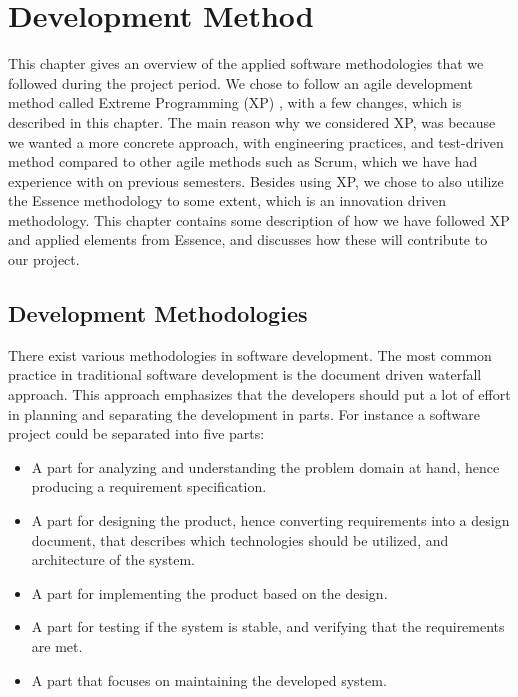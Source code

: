 
\chapter{Development Method}
\label{cha:development_method}

This chapter gives an overview of the applied software methodologies that we followed during the project period. We chose to follow an agile development method called Extreme Programming (XP) \parencite{xp}, with a few changes, which is described in this chapter. The main reason why we considered XP, was because we wanted a more concrete approach, with engineering practices, and test-driven method compared to other agile methods such as Scrum, which we have had experience with on previous semesters. Besides using XP, we chose to also utilize the Essence methodology \parencite{essence_book} to some extent, which is an innovation driven methodology. This chapter contains some description of how we have followed XP and applied elements from Essence, and discusses how these will contribute to our project.

\section{Development Methodologies}
\label{sec:development_methodologies}
There exist various methodologies in software development. The most common practice in traditional software development is the document driven waterfall approach. This approach emphasizes that the developers should put a lot of effort in planning and separating the development in parts. For instance a software project could be separated into five parts:
\\
\begin{itemize}[noitemsep]
    \item A part for analyzing and understanding the problem domain at hand, hence producing a requirement specification. 
    \item A part for designing the product, hence converting requirements into a design document, that describes which technologies should be utilized,  and architecture of the system. 
    \item A part for implementing the product based on the design.
    \item A part for testing if the system is stable, and verifying that the requirements are met. 
    \item A part that focuses on maintaining the developed system. 
\end{itemize}

